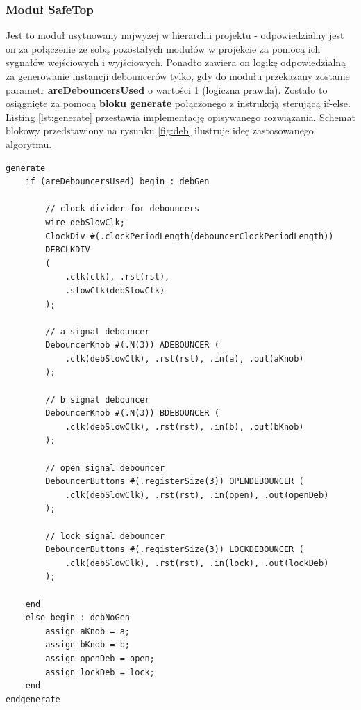 \documentclass[12pt] {article}
\begin{document}
\subsubsection{Moduł SafeTop}
Jest to moduł usytuowany najwyżej w hierarchii projektu - odpowiedzialny jest on za połączenie ze sobą pozostałych modułów w projekcie za pomocą ich sygnałów wejściowych i wyjściowych. Ponadto zawiera on logikę odpowiedzialną za generowanie instancji debouncerów tylko, gdy do modułu przekazany zostanie parametr \textbf{areDebouncersUsed} o wartości 1 (logiczna prawda). Zostało to osiągnięte za pomocą \textbf{bloku generate} połączonego z instrukcją sterującą if-else. Listing \ref{lst:generate} przestawia implementację opisywanego rozwiązania. Schemat blokowy przedstawiony na rysunku \ref{fig:deb} ilustruje ideę zastosowanego algorytmu.
\begin{lstlisting}[style={verilog-style}, caption={Przykład zastosowania bloku generate do warunkowego generowania instancji debouncerów w module SafeTop}, label={lst:generate}]
generate 
    if (areDebouncersUsed) begin : debGen
        
        // clock divider for debouncers
        wire debSlowClk;
       	ClockDiv #(.clockPeriodLength(debouncerClockPeriodLength))
       	DEBCLKDIV 
       	(
       	    .clk(clk), .rst(rst), 
            .slowClk(debSlowClk)
        );
            
        // a signal debouncer 
        DebouncerKnob #(.N(3)) ADEBOUNCER (
            .clk(debSlowClk), .rst(rst), .in(a), .out(aKnob)
        );
            
        // b signal debouncer 
        DebouncerKnob #(.N(3)) BDEBOUNCER (
            .clk(debSlowClk), .rst(rst), .in(b), .out(bKnob)
        );
            
        // open signal debouncer
        DebouncerButtons #(.registerSize(3)) OPENDEBOUNCER (
            .clk(debSlowClk), .rst(rst), .in(open), .out(openDeb)
        );
            
        // lock signal debouncer
        DebouncerButtons #(.registerSize(3)) LOCKDEBOUNCER (
            .clk(debSlowClk), .rst(rst), .in(lock), .out(lockDeb)
        );
            
    end
    else begin : debNoGen
    	assign aKnob = a;
        assign bKnob = b;
        assign openDeb = open;
        assign lockDeb = lock;
    end
endgenerate
\end{lstlisting}
\end{document}
